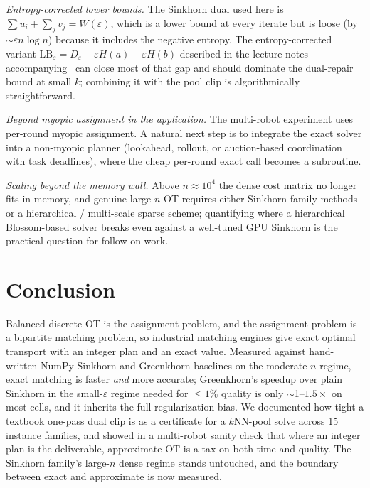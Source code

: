 \documentclass[11pt]{article}
\theoremstyle{remark}
\begin{document}
\emph{Entropy-corrected lower bounds.} The Sinkhorn dual used here is
$\sum u_i+\sum_j v_j = W(\varepsilon)$, which is a lower bound at every
iterate but is loose (by $\sim\varepsilon n\log n$) because it includes
the negative entropy. The entropy-corrected variant
$\mathrm{LB}_\varepsilon=D_\varepsilon-\varepsilon H(a)-\varepsilon H(b)$
described in the lecture notes accompanying~\cite{peyre2019} can close
most of that gap and should dominate the dual-repair bound at small $k$;
combining it with the pool clip is algorithmically straightforward.

\emph{Beyond myopic assignment in the application.} The multi-robot
experiment uses per-round myopic assignment. A natural next step is to
integrate the exact solver into a non-myopic planner (lookahead,
rollout, or auction-based coordination with task deadlines), where the
cheap per-round exact call becomes a subroutine.

\emph{Scaling beyond the memory wall.} Above $n\approx 10^4$ the dense
cost matrix no longer fits in memory, and genuine large-$n$ OT requires
either Sinkhorn-family methods or a hierarchical / multi-scale sparse
scheme; quantifying where a hierarchical Blossom-based solver breaks
even against a well-tuned GPU Sinkhorn is the practical question for
follow-on work.

\section{Conclusion}
Balanced discrete OT is the assignment problem, and the assignment problem
is a bipartite matching problem, so industrial matching engines give exact
optimal transport with an integer plan and an exact value. Measured
against hand-written NumPy Sinkhorn and Greenkhorn baselines on the
moderate-$n$ regime, exact matching is faster \emph{and} more accurate;
Greenkhorn's speedup over plain Sinkhorn in the small-$\varepsilon$ regime
needed for $\le 1\%$ quality is only $\sim$1--$1.5\times$ on most cells,
and it inherits the full regularization bias. We documented how tight a
textbook one-pass dual clip is as a certificate for a $k$NN-pool solve
across 15 instance families, and showed in a multi-robot sanity check that
where an integer plan is the deliverable, approximate OT is a tax on both
time and quality. The Sinkhorn family's large-$n$ dense regime stands
untouched, and the boundary between exact and approximate is now measured.
\end{document}
